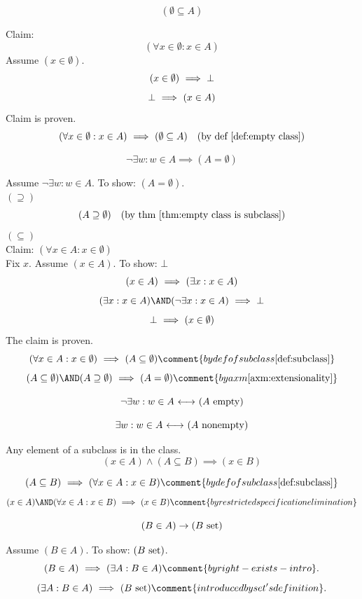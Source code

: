 \begin{theorem}
\label{thm:empty class is subclass}
\[
(\emptyset\subseteq A)
\]
\end{theorem}
\Proof
Claim:
\[
(\forall x\in \emptyset: x\in A)
\]
Assume $(x\in\emptyset)$.
\[
(x\in\emptyset)
\ \Longrightarrow\ 
\bot
\]
\[
\bot
\ \Longrightarrow\ 
(x\in A)
\]
Claim is proven.
\[
(\forall x\in \emptyset: x\in A)
\ \Longrightarrow\ 
(\emptyset\subseteq A)
\quad\mbox{(by def \ref{def:empty class})}
\]
\Done

\begin{theorem}
\[
\neg\exists w: w\in A
\implies
(A=\emptyset)
\]
\end{theorem}
\Proof
Assume $\neg\exists w: w\in A$. To show: $(A=\emptyset)$.\\
$(\supseteq)$\\
\[
(A\supseteq\emptyset)
\quad\mbox{(by thm \ref{thm:empty class is subclass})}
\]
$(\subseteq)$\\
Claim: $(\forall x\in A:x\in\emptyset)$\\
Fix $x$. Assume $(x\in A)$. To show: $\bot$\\
\[
(x\in A)
\ \Longrightarrow\ 
(\exists x:x\in A)
\]
\[
(\exists x:x\in A)
\AND
(\neg\exists x:x\in A)
\IMPLIES
\bot
\]
\[
\bot
\ \Longrightarrow\ 
(x\in\emptyset)
\]
The claim is proven.
\[
(\forall x\in A:x\in\emptyset)
\IMPLIES
(A \subseteq \emptyset)
\comment{by def of subclass \ref{def:subclass}}
\]
\[
(A \subseteq \emptyset)
\AND
(A \supseteq \emptyset)
\IMPLIES
(A=\emptyset)
\comment{by axm \ref{axm:extensionality}}
\]
\Done
\begin{theorem}
\[
\neg\exists w: w\in A
{\ \longleftrightarrow\ }
(A\mathrm{\ empty})
\]
\end{theorem}
\begin{theorem}
\[
\exists w: w\in A
{\ \longleftrightarrow\ }
(A\mathrm{\ nonempty})
\]
\end{theorem}


\begin{theorem}
Any element of a subclass is in the class.
\label{thm:element of subclass}
\[
(x\in A)\land(A\subseteq B)\implies(x\in B)
\]
\end{theorem}
\Proof
\[
(A\subseteq B)
\IMPLIES
(\forall x\in A:x\in B)
\comment{by def of subclass \ref{def:subclass}}
\]
\[
(x\in A)
\AND
(\forall x\in A:x\in B)
\IMPLIES
(x\in B)
\comment{by restricted specification elimination}
\]
\Done


\begin{theorem}
\label{thm:in class then set}
\[
(B\in A) \rightarrow (B\mathrm{\ set})
\]
\end{theorem}
\Proof
Assume $(B\in A)$. To show: $(B\mathrm{\ set})$.
\[
(B\in A)
\IMPLIES
(\exists A: B\in A)
\comment{by right-exists-intro}.
\]
\[
(\exists A: B\in A)
\IMPLIES
(B\set)
\comment{introduced by set's definition}.
\]
\Done

